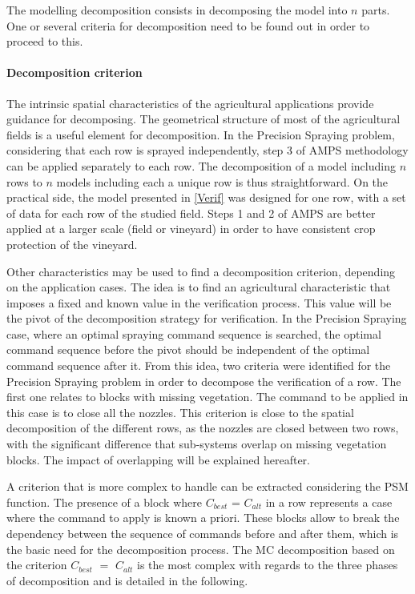 The modelling decomposition consists in decomposing the model into $n$ parts. One or several criteria for decomposition need to be found out in order to proceed to this.

\paragraph{\textbf{Decomposition criterion}} 

The intrinsic spatial characteristics of the agricultural applications provide guidance for decomposing. The geometrical structure of most of the agricultural fields is a useful element for decomposition. In the Precision Spraying problem, considering that each row is sprayed independently, step 3 of AMPS methodology can be applied separately to each row. The decomposition of a model including $n$ rows to $n$ models including each a unique row is thus straightforward. On the practical side, the model presented in \ref{Verif} was designed for one row, with a set of data for each row of the studied field.
Steps 1 and 2 of AMPS are better applied at a larger scale (field or vineyard) in order to have consistent crop protection of the vineyard.

Other characteristics may be used to find a decomposition criterion, depending on the application cases. The idea is to find an agricultural characteristic that imposes a fixed and known value in the verification process. This value will be the pivot of the decomposition strategy for verification.
In the Precision Spraying case, where an optimal spraying command sequence is searched, the optimal command sequence before the pivot should be independent of the optimal command sequence after it. From this idea, two criteria were identified for the Precision Spraying problem in order to decompose the verification of a row.
The first one relates to blocks with missing vegetation. The command to be applied in this case is to close all the nozzles. This criterion is close to the spatial decomposition of the different rows, as the nozzles are closed between two rows, with the significant difference that sub-systems overlap on missing vegetation blocks. The impact of overlapping will be explained hereafter.

A criterion that is more complex to handle can be extracted considering the PSM function. The presence of a block where $C_{best}$ = $C_{alt}$ in a row represents a case where the command to apply is known a priori. These blocks allow to break the dependency between the sequence of commands before and after them, which is the basic need for the decomposition process. The MC decomposition based on the criterion $C_{best}$ $=$ $C_{alt}$ is the most complex with regards to the three phases of decomposition and is detailed in the following.

